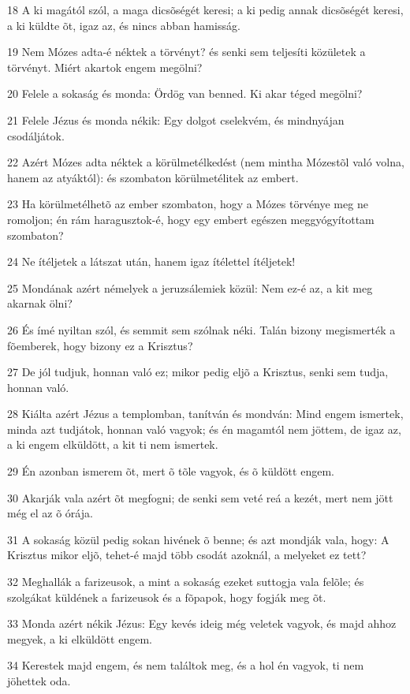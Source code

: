 \par 18 A ki magától szól, a maga dicsõségét keresi; a ki pedig annak dicsõségét keresi, a ki küldte õt, igaz az, és nincs abban hamisság.
\par 19 Nem Mózes adta-é néktek a törvényt? és senki sem teljesíti közületek a törvényt. Miért akartok engem megölni?
\par 20 Felele a sokaság és monda: Ördög van benned. Ki akar téged megölni?
\par 21 Felele Jézus és monda nékik: Egy dolgot cselekvém, és mindnyájan csodáljátok.
\par 22 Azért Mózes adta néktek a körülmetélkedést (nem mintha Mózestõl való volna, hanem az atyáktól): és szombaton körülmetélitek az embert.
\par 23 Ha körülmetélhetõ az ember szombaton, hogy a Mózes törvénye meg ne romoljon; én rám haragusztok-é, hogy egy embert egészen meggyógyítottam szombaton?
\par 24 Ne ítéljetek a látszat után, hanem igaz ítélettel ítéljetek!
\par 25 Mondának azért némelyek a jeruzsálemiek közül: Nem ez-é az, a kit meg akarnak ölni?
\par 26 És ímé nyiltan szól, és semmit sem szólnak néki. Talán bizony megismerték a fõemberek, hogy bizony ez a Krisztus?
\par 27 De jól tudjuk, honnan való ez; mikor pedig eljõ a Krisztus, senki sem tudja, honnan való.
\par 28 Kiálta azért Jézus a templomban, tanítván és mondván: Mind engem ismertek, minda azt tudjátok, honnan való vagyok; és én magamtól nem jöttem, de igaz  az, a ki engem elküldött, a kit ti nem ismertek.
\par 29 Én azonban ismerem õt, mert õ tõle vagyok, és õ küldött engem.
\par 30 Akarják vala azért õt megfogni; de senki sem veté reá a kezét, mert nem jött még el az õ órája.
\par 31 A sokaság közül pedig sokan hivének õ benne; és azt mondják vala, hogy: A Krisztus mikor eljõ, tehet-é majd több csodát azoknál, a melyeket ez tett?
\par 32 Meghallák a farizeusok, a mint a sokaság ezeket suttogja vala felõle; és szolgákat küldének a farizeusok és a fõpapok, hogy fogják meg õt.
\par 33 Monda azért nékik Jézus: Egy kevés ideig még veletek vagyok, és majd ahhoz megyek, a ki elküldött engem.
\par 34 Kerestek majd engem, és nem találtok meg, és a hol én vagyok, ti nem jöhettek oda.
